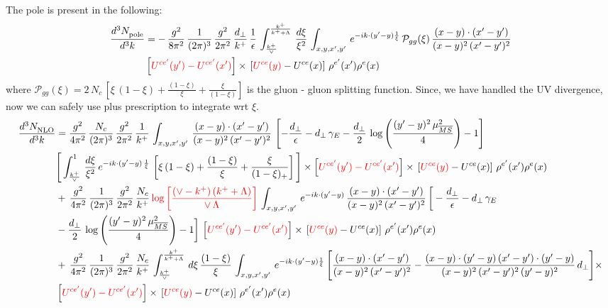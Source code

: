\documentclass[9pt]{article}
\numberwithin{equation}{section}
\begin{document}
The pole is present in the following:
\begin{align}
    \frac{d^{3}N_{\rm pole}^{\rm}}{d^{3}k}  & = -\,\frac{g^{2}}{8\pi^{2}}\, \frac{1}{(2\pi)^{3}}\,\frac{g^{2}}{2\pi^{2}}\, \frac{d_{\perp}}{k^{+}}\,\frac{1}{\epsilon}\,\int_{\frac{k^{+}}{\vee}}^{\frac{k^{+}}{k^{+}+\Lambda}}\, \frac{d\xi}{\xi^{2}}\, \int_{x,y,x',y'}\,e^{-ik\cdot (y'-y)\frac{1}{\xi}}\,\mathcal{P}_{gg}(\xi)\,\frac{(x-y)\cdot (x'-y')}{(x-y)^{2}\,(x'-y')^{2}}\notag \\ & \left[{\color{red}U^{ce'}(y') - U^{ce'}(x')}\right] \times\, \left[{\color{red}U^{ce}(y)} - U^{ce}(x)\right]\, \rho^{e'}(x') \rho^{e}(x)
\end{align}
where $\mathcal{P}_{gg}(\xi) = 2\,N_{c}\,\left[\xi\,(1-\xi)+\frac{(1-\xi)}{\xi}+\frac{\xi}{(1-\xi)}\right]$ is the gluon - gluon splitting function. Since, we have handled the UV divergence, now we can safely use plus prescription to integrate wrt $\xi$. 
\begin{align}
    \frac{d^{3}N_{\rm NLO}^{\rm}}{d^{3}k}  & = \frac{g^{2}}{4\pi^{2}}\, \frac{N_{c}}{(2\pi)^{3}}\,\frac{g^{2}}{2\pi^{2}}\, \frac{1}{k^{+}}\,\int_{x,y,x',y'}\,\frac{(x-y)\cdot (x'-y')}{(x-y)^{2}\,(x'-y')^{2}}\,\left[-\frac{d_{\perp}}{\epsilon}-d_{\perp}\,\gamma_{E}-\frac{d_{\perp}}{2}\,\log{\left(\frac{(y'-y)^{2}\,\mu^{2}_{\overline{MS}}}{4}\right)}-1\right]\,\notag \\ & \Bigg[\int_{\frac{k^{+}}{\vee}}^{1}\,\frac{d\xi}{\xi^{2}}\,e^{-ik\cdot (y'-y)\,\frac{1}{\xi}}\,\left[\xi\,(1-\xi)+\frac{(1-\xi)}{\xi}+\frac{\xi}{(1-\xi)_{+}}\right]\Bigg]\times \left[{\color{red}U^{ce'}(y') - U^{ce'}(x')}\right] \times\, \left[{\color{red}U^{ce}(y)} - U^{ce}(x)\right]\, \rho^{e'}(x') \rho^{e}(x)\notag \\ &  +\, \frac{g^{2}}{4\pi^{2}}\, \frac{1}{(2\pi)^{3}}\,\frac{g^{2}}{2\pi^{2}}\, \frac{N_{c}}{k^{+}}\,{\color{red}\log{\left[\frac{(\vee-k^{+})\,(k^{+}+\Lambda)}{\vee\,\Lambda}\right]}}\,\int_{x,y,x',y'}\,e^{-ik\cdot (y'-y)}\,\frac{(x-y)\cdot (x'-y')}{(x-y)^{2}\,(x'-y')^{2}}\,\bigg[-\frac{d_{\perp}}{\epsilon}-d_{\perp}\,\gamma_{E}\notag \\ & -\frac{d_{\perp}}{2}\,\log{\left(\frac{(y'-y)^{2}\,\mu^{2}_{\overline{MS}}}{4}\right)}-1\bigg]\,\left[{\color{red}U^{ce'}(y') - U^{ce'}(x')}\right] \times\, \left[{\color{red}U^{ce}(y)} - U^{ce}(x)\right]\, \rho^{e'}(x') \rho^{e}(x)\notag \\ & +\,\frac{g^{2}}{4\pi^{2}}\, \frac{1}{(2\pi)^{3}}\,\frac{g^{2}}{2\pi^{2}}\, \frac{N_{c}}{k^{+}}\,\int_{\frac{k^{+}}{\vee}}^{\frac{k^{+}}{k^{+}+\Lambda}}\,d\xi\, \frac{(1-\xi)}{\xi}\, \int_{x,y,x',y'}\,e^{-ik\cdot (y'-y)\frac{1}{\xi}}\,\Bigg[\frac{(x-y)\cdot (x'-y')}{(x-y)^{2}\, (x'-y')^{2}} -\frac{(x-y)\cdot (y'-y)\, (x'-y')\cdot (y'-y)}{(x-y)^{2}\,(x'-y')^{2}\,(y'-y)^{2}}\,d_{\perp}\Bigg]\times\notag \\ &  \left[{\color{red}U^{ce'}(y') - U^{ce'}(x')}\right] \times\, \left[{\color{red}U^{ce}(y)} - U^{ce}(x)\right]\, \rho^{e'}(x') \rho^{e}(x)
\end{align}
\end{document}

